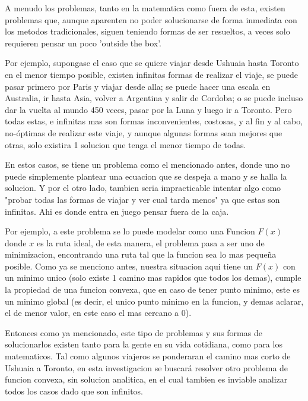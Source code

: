\documentclass{article}
\begin{document}
\noindent A menudo los problemas, tanto en la matematica como fuera de esta, existen problemas que, aunque aparenten no poder solucionarse de forma inmediata con los metodos tradicionales, siguen teniendo formas de ser resueltos, a veces solo requieren pensar un poco 'outside the box'. \vspace{\baselineskip}

\noindent Por ejemplo, supongase el caso que se quiere viajar desde Ushuaia hasta Toronto en el menor tiempo posible, existen infinitas formas de realizar el viaje, se puede pasar primero por Paris y viajar desde alla; se puede hacer una escala en Australia, ir hasta Asia, volver a Argentina y salir de Cordoba; o se puede incluso dar la vuelta al mundo 450 veces, pasar por la Luna y luego ir a Toronto. Pero todas estas, e infinitas mas son formas inconvenientes, costosas, y al fin y al cabo, no-óptimas de realizar este viaje, y aunque algunas formas sean mejores que otras, solo existira 1 solucion que tenga el menor tiempo de todas. \vspace{\baselineskip}

\noindent En estos casos, se tiene un problema como el mencionado antes, donde uno no puede simplemente plantear una ecuacion que se despeja a mano y se halla la solucion. Y por el otro lado, tambien seria impracticable intentar algo como "probar todas las formas de viajar y ver cual tarda menos" ya que estas son infinitas. Ahi es donde entra en juego pensar fuera de la caja. \vspace{\baselineskip}

\noindent Por ejemplo, a este problema se lo puede modelar como una Funcion $F(x)$ donde $x$ es la ruta ideal, de esta manera, el problema pasa a ser uno de minimizacion, encontrando una ruta tal que la funcion sea lo mas pequeña posible. Como ya se menciono antes, nuestra situacion aqui tiene un $F(x)$ con un minimo unico (solo existe 1 camino mas rapidos que todos los demas), cumple la propiedad de una funcion convexa, que en caso de tener punto minimo, este es un minimo global (es decir, el unico punto minimo en la funcion, y demas aclarar, el de menor valor, en este caso el mas cercano a 0). \vspace{\baselineskip}

\noindent Entonces como ya mencionado, este tipo de problemas y sus formas de solucionarlos existen tanto para la gente en su vida cotidiana, como para los matematicos. Tal como algunos viajeros se ponderaran el camino mas corto de Ushuaia a Toronto, en esta investigacion se buscará resolver otro problema de funcion convexa, sin solucion analitica, en el cual tambien es inviable analizar todos los casos dado que son infinitos. \vspace{\baselineskip}
\end{document}
